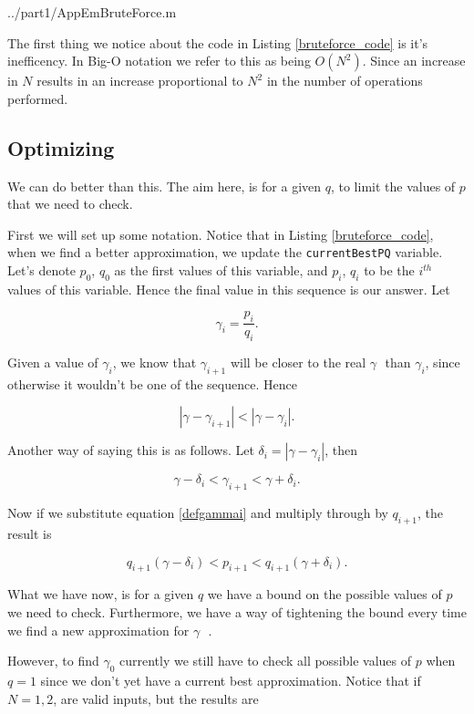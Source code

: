 \documentclass[10pt]{article}
\newcommand*{\gam}{$\gamma \text{ }$}
\newcommand*{\gami}{$\gamma_{i}$}
\begin{document}
   {../part1/AppEmBruteForce.m}

The first thing we notice about the code in Listing \ref{bruteforce_code} is it's inefficency. In Big-O notation we refer to this as being $O(N^2)$. Since an increase in $N$ results in an increase proportional to $N^2$ in the number of operations performed.

\subsection{Optimizing}
We can do better than this. The aim here, is for a given $q$, to limit the values of $p$ that we need to check. 

First we will set up some notation. Notice that in Listing \ref{bruteforce_code}, when we find a better approximation, we update the \texttt{currentBestPQ} variable. Let's denote $p_0$, $q_0$  as the first values of this variable, and $p_i$, $q_i$ to be the $i^{th}$ values of this variable. Hence the final value in this sequence is our answer. Let

\begin{equation} \label{defgammai}
  \gamma_i = \frac{p_i}{q_i}.
\end{equation}


Given a value of \gami, we know that $\gamma_{i+1}$ will be closer to the real \gam than \gami, since otherwise it wouldn't be one of the sequence. Hence

$$ |\gamma- \gamma_{i+1}| < |\gamma - \gamma_{i}| .$$

Another way of saying this is as follows. Let $\delta_{i} = | \gamma - \gamma_i  |$, then

$$ \gamma - \delta_i < \gamma_{i+1} < \gamma + \delta_i .$$

Now if we substitute equation \ref{defgammai} and multiply through by $q_{i+1}$, the result is

\begin{equation} \label{em_constraint}
q_{i+1} (\gamma - \delta_i) < p_{i+1} < q_{i+1} ( \gamma + \delta_i ).
\end{equation} 

What we have now, is for a given $q$ we have a bound on the possible values of $p$ we need to check. Furthermore, we have a way of tightening the bound every time we find a new approximation for \gam.

However, to find $\gamma_0$ currently we still have to check all possible values of $p$ when $q = 1$ since we don't yet have a current best approximation. Notice that if $N = 1,2$, are valid inputs, but the results are
\end{document}
